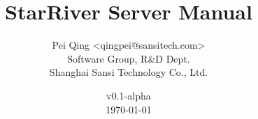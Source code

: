 \title{\textbf{StarRiver Server Manual}}

\author{Pei Qing <qingpei@sansitech.com> \\
        Software Group, R\&D Dept.\\
        Shanghai Sansi Technology Co., Ltd.
}

\date{\vspace{3em} v0.1-alpha \\\vspace{3em} \today}
